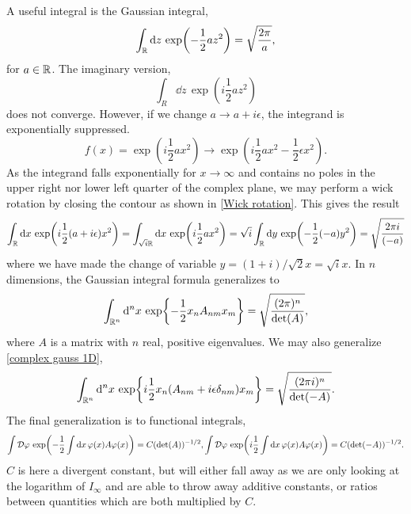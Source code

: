 A useful integral is the Gaussian integral,
\begin{equation}
    \int_{\mathbb{R}} \dd z \, \exp(- \frac{1}{2} a z^2) = \sqrt{\frac{2 \pi}{a}},
\end{equation}
for $a \in \mathbb{R}$. The imaginary version,
\begin{equation}
    \int_R \dd z \, \exp(i \frac{1}{2} a z^2 )
\end{equation}
does not converge. However, if we change $a \rightarrow a + i\epsilon$, the integrand is exponentially suppressed.
\begin{equation}
    f(x) = \exp(i \frac{1}{2}a x^2) \rightarrow
    \exp(i\frac{1}{2}a x^2 - \frac{1}{2} \epsilon  x^2).
\end{equation}
As the integrand falls exponentially for $x\rightarrow \infty$ and contains no poles in the upper right nor lower left quarter of the complex plane, we may perform a wick rotation by closing the contour as shown in \autoref{Wick rotation}.
This gives the result
\begin{equation}
    \label{complex gauss 1D}
    \int_{\mathbb{R}} \dd x \, \exp(i \frac{1}{2}(a + i\epsilon) x^2) 
    = \int_{\sqrt{i}\mathbb{R}} \dd x \, \exp(i\frac{1}{2} ax^2)
    = \sqrt{i} \int_{\mathbb{R}} \dd y\, \exp(-\frac{1}{2} (-a) y^2) = \sqrt{\frac{2 \pi i}{(-a)}}
\end{equation}
where we have made the change of variable $y = (1+i)/\sqrt{2} x = \sqrt{i} x$.
In $n$ dimensions, the Gaussian integral formula generalizes to
\begin{equation}
    \int_{\mathbb{R}^n} \dd^n x \, \exp{-\frac{1}{2} x_n A_{nm} x_m } =\sqrt{\frac{(2 \pi)^n}{\det(A)}},
\end{equation}
where $A$ is a matrix with $n$ real, positive eigenvalues.
We may also generalize \autoref{complex gauss 1D},
\begin{align}
    \int_{\mathbb{R}^n} \dd^n x \, \exp{i\frac{1}{2} x_n( A_{nm} + i \epsilon \delta_{nm}) x_m } =\sqrt{\frac{(2 \pi i )^n}{\det(-A)}}.
\end{align}
The final generalization is to functional integrals,
\begin{align}
    \int \mathcal{D} \varphi \, \exp(- \frac{1}{2} \int \dd x \, \varphi(x) A \varphi(x) )
    = C (\det(A))^{-1/2},
    \int \mathcal{D} \varphi \, \exp(i\frac{1}{2} \int \dd x \, \varphi(x) A \varphi(x) )
    = C (\det(-A))^{-1/2}.
\end{align}
$C$ is here a divergent constant, but will either fall away as we are only looking at the logarithm of $I_\infty$ and are able to throw away additive constants, or ratios between quantities which are both multiplied by $C$.

